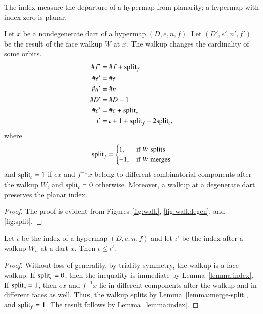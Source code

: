 The index measure the departure of a hypermap from planarity; a
hypermap with index zero is planar.

\begin{lemma}\label{lemma:index} 
Let $x$ be a nondegenerate dart of a hypermap $(D,e,n,f)$. Let
$(D',e',n',f')$ be the result of the face walkup $W$ at $x$.  The
walkup changes the cardinality of some orbits.
\begin{align*}
\# f' &=\# f +{\operatorname{split}}_f  \\  
\# e'&=\# e \\
\# n'&=\# n \\
\# D'&=\# D - 1 \\
\#c'&=\# c + {\operatorname{split}}_c\\
\iota' &= \iota + 1+{\operatorname{split}}_f - 2{\operatorname{split}}_c,\\
\end{align*}
where
\[ 
{\operatorname{split}}_f = \begin{cases}
1,&\text{if $W$ splits }\\
-1,&\text{if $W$ merges}\\
\end{cases}
\] 
and ${\operatorname{split}}_c=1$ if $e x$ and $f^{-1} x$ belong to different
combinatorial components after the walkup $W$, and ${\operatorname{split}}_c=0$
otherwise. Moreover, a walkup at a degenerate dart preserves the
planar index.  %
%
\end{lemma}

\begin{proof} The proof is evident from Figures \ref{fig:walk},
  \ref{fig:walkdegen}, and \ref{fig:split}.
\end{proof}

\begin{lemma}\label{lemma:planar-index2}
Let $\iota$ be the index of a hypermap $(D,e,n,f)$ and let $\iota'$
be the index after a walkup $W_h$ at a dart $x$.  Then $\iota \le
\iota'$.
\end{lemma} 


\begin{proof} Without loss of generality, by triality symmetry, the
walkup is a face walkup.  If ${\operatorname{split}}_c=0$, then the inequality is
immediate by Lemma~\ref{lemma:index}.  If ${\operatorname{split}}_c=1$, 
then $e x$ and $f^{-1} x$ lie in
different components after the walkup and in different
faces as well.  Thus, the walkup splits by Lemma~\ref{lemma:merge-split}, and
  ${\operatorname{split}}_f = 1$.  The result
follows by Lemma~\ref{lemma:index}.
\end{proof}

